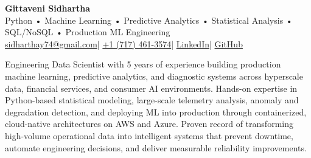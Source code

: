 \documentclass[letterpaper,9.5pt]{article}
\newcommand{\resumeSection}[1]{%
  \vspace{3pt}\noindent{\large\bfseries\color{linkblue}#1}\par
  \vspace{-3pt}\noindent{\color{linkblue}\rule{\textwidth}{0.45pt}}\vspace{1pt}%
}
\begin{document}
\begin{center}
  {\Huge\bfseries Gittaveni Sidhartha}\\[2pt]
  {\large Python • Machine Learning • Predictive Analytics • Statistical Analysis • SQL/NoSQL • Production ML Engineering}\\[4pt]
  {\small
    \href{mailto:sidharthay74@gmail.com}{sidharthay74@gmail.com}\enspace|\enspace
    \href{tel:+17174613574}{+1 (717) 461-3574}\enspace|\enspace
    \href{https://www.linkedin.com/in/sidharthay74/}{LinkedIn}\enspace|\enspace
    \href{https://github.com/zentrium74}{GitHub}
  }
\end{center}
\vspace{-3pt}

\resumeSection{Summary}
Engineering Data Scientist with 5 years of experience building production machine learning, predictive analytics, and diagnostic systems across hyperscale data, financial services, and consumer AI environments. Hands-on expertise in Python-based statistical modeling, large-scale telemetry analysis, anomaly and degradation detection, and deploying ML into production through containerized, cloud-native architectures on AWS and Azure. Proven record of transforming high-volume operational data into intelligent systems that prevent downtime, automate engineering decisions, and deliver measurable reliability improvements.
\end{document}
